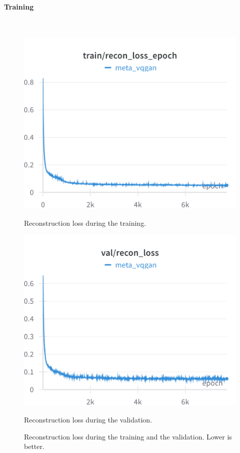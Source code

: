 \paragraph{Training}\mbox{}\\

\begin{figure}[H]
\includegraphics[width=\linewidth]{detailed_engineering/Meta VQGAN/charts/Section-2-Panel-13-1qhe42yar.png}
\caption{Reconstruction loss during the training.}
\endminipage\hfill
{}
\includegraphics[width=\linewidth]{detailed_engineering/Meta VQGAN/charts/Section-4-Panel-3-hkj1c12xb.png}
\caption{Reconstruction loss during the validation.}
\endminipage
\caption{Reconstruction loss during the training and the validation. Lower is better.}
\end{figure}


